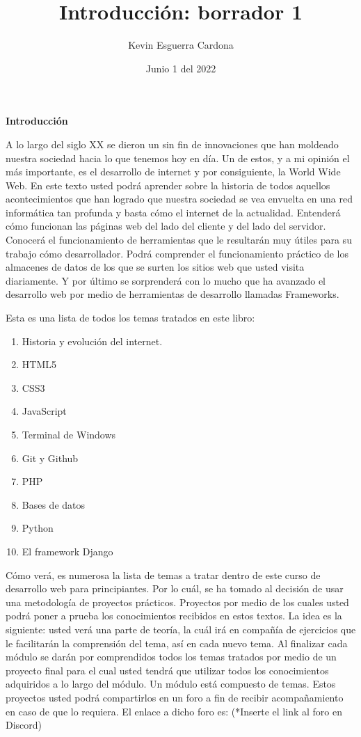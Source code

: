 \documentclass{article}
\title{Introducción: borrador 1}
\author{Kevin  Esguerra Cardona}
\date{Junio 1 del 2022}
\begin{document}
\maketitle

\textbf{Introducción}

A lo largo del siglo XX se dieron un sin fin de innovaciones que han moldeado nuestra sociedad hacia lo que tenemos hoy en día. Un de estos,
y a mi opinión el más importante, es el desarrollo de internet y por consiguiente, la World Wide Web. En este texto usted podrá aprender 
sobre la historia de todos aquellos acontecimientos que han logrado que nuestra sociedad se vea envuelta en una red informática tan profunda
y basta cómo el internet de la actualidad. Entenderá cómo funcionan las páginas web del lado del cliente y del lado del servidor. Conocerá
el funcionamiento de herramientas que le resultarán muy útiles para su trabajo cómo desarrollador. Podrá comprender el funcionamiento
práctico de los almacenes de datos de los que se surten los sitios web que usted visita diariamente. Y por último se sorprenderá con lo
mucho que ha avanzado el desarrollo web por medio de herramientas de desarrollo llamadas Frameworks.

Esta es una lista de todos los temas tratados en este libro: 
\begin{enumerate}
    \item Historia y evolución del internet.
    \item HTML5
    \item CSS3
    \item JavaScript
    \item Terminal de Windows
    \item Git y Github
    \item PHP
    \item Bases de datos
    \item Python
    \item El framework Django
\end{enumerate}

Cómo verá, es numerosa la lista de temas a tratar dentro de este curso de desarrollo web para principiantes. Por lo cuál, se ha tomado al decisión de usar una metodología de proyectos prácticos. Proyectos por medio de los cuales usted podrá poner a prueba los conocimientos recibidos en estos textos. La idea es la siguiente: usted verá una parte de teoría, la cuál irá en compañía de ejercicios que le facilitarán la comprensión del tema, así en cada nuevo tema. Al finalizar cada módulo se darán por comprendidos todos los temas tratados por medio de un proyecto final para el cual usted tendrá que utilizar todos los conocimientos adquiridos a lo largo del módulo. Un módulo está compuesto de temas. Estos proyectos usted podrá compartirlos en un foro a fin de recibir acompañamiento en caso de que lo requiera. El enlace a dicho foro es: (*Inserte el link al foro en Discord)
\end{document}
